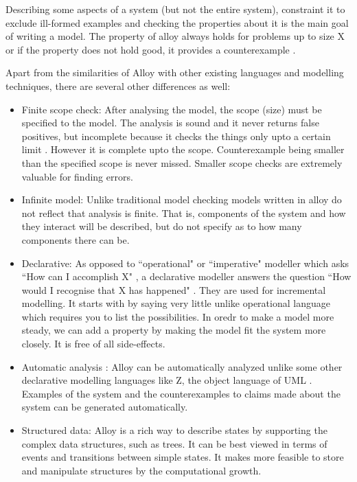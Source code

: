 \documentclass[a4paper,12pt]{report}
\begin{document}
\begin{onehalfspacing}
Describing some aspects of a system (but not the entire system), constraint it to exclude ill-formed examples and checking the properties about it is the main goal of writing a model. The property of alloy always holds for problems up to size X or if the property does not hold good, it provides a counterexample \cite{Yeung2005}.

Apart from the similarities of Alloy with other existing languages and modelling techniques, there are several other differences as well:
\begin{itemize}
\item Finite scope check: After analysing the model, the scope (size) must be specified to the model. The analysis is sound and it never returns false positives, but incomplete because it checks the things only upto a certain limit \cite{DanielJackson2004}. However it is complete upto the scope. Counterexample being smaller than the specified scope is never missed. Smaller scope checks are extremely valuable for finding errors. 
\item Infinite model: Unlike traditional model checking models written in alloy do not reflect that analysis is finite\cite{J.M.Wing1996}. That is, components of the system and how they interact will be described, but do not specify as to how many components there can be. 
\item Declarative: As opposed to ``operational" or ``imperative" modeller which asks ``How can I accomplish X" , a declarative modeller answers the question ``How would I recognise that X has happened" \cite{DanielJackson2004}. They are used for incremental modelling. It starts with by saying very little unlike operational language which requires you to list the possibilities. In oredr to make a model more steady, we can add a property by making the model fit the system more closely. It is free of all side-effects.
\item Automatic analysis : Alloy can be automatically analyzed unlike some other declarative modelling languages like Z, the object language of UML \cite{J.M.Spivey1989}. 
Examples of the system and the counterexamples to claims made about the system can be generated automatically.
\item Structured data: Alloy is a rich way to describe states by supporting the complex data structures, such as trees. It can be best viewed in terms of events and transitions between simple states. It makes more feasible to store and manipulate structures by the computational growth. 
\end{itemize}


\end{onehalfspacing}
\end{document}
